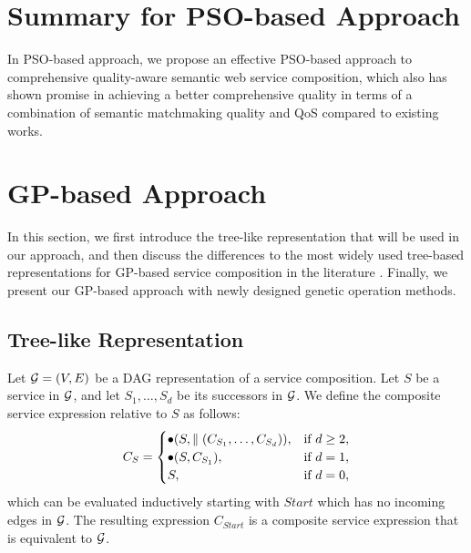 \section{Summary for PSO-based Approach}\label{summary1}

In PSO-based approach, we propose an effective PSO-based approach to comprehensive quality-aware semantic web service composition, which also has shown promise in achieving a better comprehensive quality in terms of a combination of semantic matchmaking quality and QoS compared to existing works.
\section{GP-based Approach}\label{GPApproach}

In this section, we first introduce the tree-like representation that will be used in our approach, and then discuss the differences to the most widely used tree-based representations for GP-based service composition in the literature \cite{gupta2015optimization,da2016genetic,yu2013adaptive}. Finally, we present our GP-based approach with newly designed genetic operation methods.
\subsection{Tree-like Representation}\label{representation} 

Let $\mathcal{G}=(V,E)$ be a DAG representation of a service composition. Let $S$ be a service in $\mathcal{G}$, and let $S_1,\ldots,S_d$ be its successors in $\mathcal{G}$. We define the composite service expression relative to $S$ as follows: 
\begin{equation}
\label{eq_s_expression}
    C_S=
    \begin{cases}
      \bullet(S,\parallel(C_{S_1},\ldots,C_{S_d})), & \text{if $d\ge 2$}, \\
      \bullet(S,C_{S_1}), & \text{if $d=1$}, \\
      S, & \text{if $d=0$},
    \end{cases}
\end{equation}
which can be evaluated inductively starting with $Start$ which has no incoming edges in $\mathcal{G}$. The resulting expression $C_{Start}$ is a composite service expression that is equivalent to $\mathcal{G}$.

